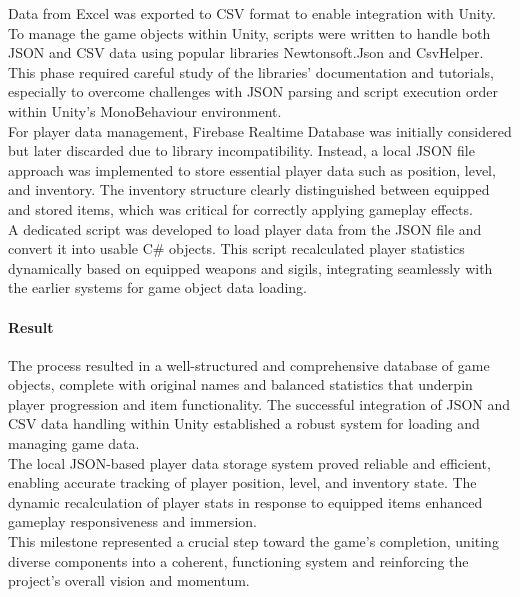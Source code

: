 \documentclass{article}
\begin{document}
Data from Excel was exported to CSV format to enable integration with Unity. To manage the game objects within Unity, scripts were written to handle both JSON and CSV data using popular libraries Newtonsoft.Json and CsvHelper. This phase required careful study of the libraries' documentation and tutorials, especially to overcome challenges with JSON parsing and script execution order within Unity's MonoBehaviour environment.\\

For player data management, Firebase Realtime Database was initially considered but later discarded due to library incompatibility. Instead, a local JSON file approach was implemented to store essential player data such as position, level, and inventory. The inventory structure clearly distinguished between equipped and stored items, which was critical for correctly applying gameplay effects.\\

A dedicated script was developed to load player data from the JSON file and convert it into usable C\# objects. This script recalculated player statistics dynamically based on equipped weapons and sigils, integrating seamlessly with the earlier systems for game object data loading.

\paragraph{Result}\hfill

The process resulted in a well-structured and comprehensive database of game objects, complete with original names and balanced statistics that underpin player progression and item functionality. The successful integration of JSON and CSV data handling within Unity established a robust system for loading and managing game data.\\

The local JSON-based player data storage system proved reliable and efficient, enabling accurate tracking of player position, level, and inventory state. The dynamic recalculation of player stats in response to equipped items enhanced gameplay responsiveness and immersion.\\

This milestone represented a crucial step toward the game's completion, uniting diverse components into a coherent, functioning system and reinforcing the project's overall vision and momentum.
\end{document}

